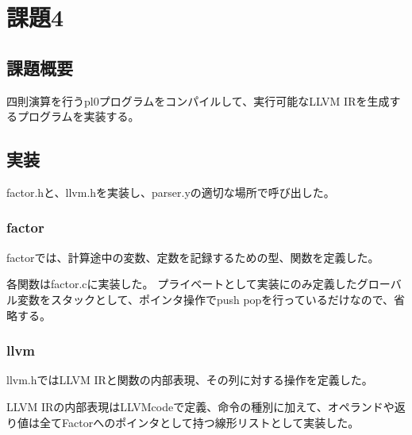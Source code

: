 \section{課題4}
\subsection{課題概要}
四則演算を行うpl0プログラムをコンパイルして、実行可能なLLVM IRを生成するプログラムを実装する。

\subsection{実装}
factor.hと、llvm.hを実装し、parser.yの適切な場所で呼び出した。

\subsubsection{factor}
factorでは、計算途中の変数、定数を記録するための型、関数を定義した。


各関数はfactor.cに実装した。
プライベートとして実装にのみ定義したグローバル変数をスタックとして、ポインタ操作でpush popを行っているだけなので、省略する。

\subsubsection{llvm}
llvm.hではLLVM IRと関数の内部表現、その列に対する操作を定義した。

LLVM IRの内部表現はLLVMcodeで定義、命令の種別に加えて、オペランドや返り値は全てFactorへのポインタとして持つ線形リストとして実装した。

